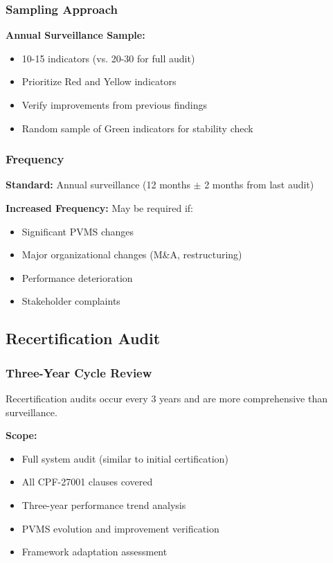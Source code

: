 \documentclass[11pt,a4paper]{article}
\begin{document}
\subsubsection{Sampling Approach}

\textbf{Annual Surveillance Sample:}
\begin{itemize}
\item 10-15 indicators (vs. 20-30 for full audit)
\item Prioritize Red and Yellow indicators
\item Verify improvements from previous findings
\item Random sample of Green indicators for stability check
\end{itemize}

\subsubsection{Frequency}

\textbf{Standard:} Annual surveillance (12 months $\pm$ 2 months from last audit)

\textbf{Increased Frequency:} May be required if:
\begin{itemize}
\item Significant PVMS changes
\item Major organizational changes (M\&A, restructuring)
\item Performance deterioration
\item Stakeholder complaints
\end{itemize}

\subsection{Recertification Audit}

\subsubsection{Three-Year Cycle Review}

Recertification audits occur every 3 years and are more comprehensive than surveillance.

\textbf{Scope:}
\begin{itemize}
\item Full system audit (similar to initial certification)
\item All CPF-27001 clauses covered
\item Three-year performance trend analysis
\item PVMS evolution and improvement verification
\item Framework adaptation assessment
\end{itemize}
\end{document}
